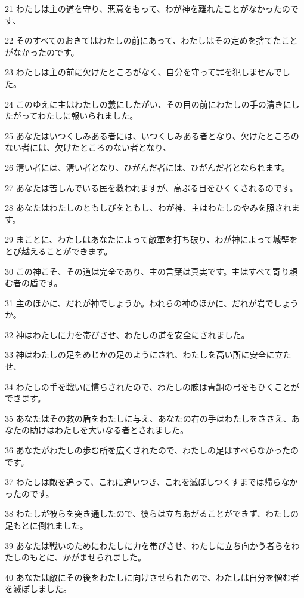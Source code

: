 \par 21 わたしは主の道を守り、悪意をもって、わが神を離れたことがなかったのです、
\par 22 そのすべてのおきてはわたしの前にあって、わたしはその定めを捨てたことがなかったのです。
\par 23 わたしは主の前に欠けたところがなく、自分を守って罪を犯しませんでした。
\par 24 このゆえに主はわたしの義にしたがい、その目の前にわたしの手の清きにしたがってわたしに報いられました。
\par 25 あなたはいつくしみある者には、いつくしみある者となり、欠けたところのない者には、欠けたところのない者となり、
\par 26 清い者には、清い者となり、ひがんだ者には、ひがんだ者となられます。
\par 27 あなたは苦しんでいる民を救われますが、高ぶる目をひくくされるのです。
\par 28 あなたはわたしのともしびをともし、わが神、主はわたしのやみを照されます。
\par 29 まことに、わたしはあなたによって敵軍を打ち破り、わが神によって城壁をとび越えることができます。
\par 30 この神こそ、その道は完全であり、主の言葉は真実です。主はすべて寄り頼む者の盾です。
\par 31 主のほかに、だれが神でしょうか。われらの神のほかに、だれが岩でしょうか。
\par 32 神はわたしに力を帯びさせ、わたしの道を安全にされました。
\par 33 神はわたしの足をめじかの足のようにされ、わたしを高い所に安全に立たせ、
\par 34 わたしの手を戦いに慣らされたので、わたしの腕は青銅の弓をもひくことができます。
\par 35 あなたはその救の盾をわたしに与え、あなたの右の手はわたしをささえ、あなたの助けはわたしを大いなる者とされました。
\par 36 あなたがわたしの歩む所を広くされたので、わたしの足はすべらなかったのです。
\par 37 わたしは敵を追って、これに追いつき、これを滅ぼしつくすまでは帰らなかったのです。
\par 38 わたしが彼らを突き通したので、彼らは立ちあがることができず、わたしの足もとに倒れました。
\par 39 あなたは戦いのためにわたしに力を帯びさせ、わたしに立ち向かう者らをわたしのもとに、かがませられました。
\par 40 あなたは敵にその後をわたしに向けさせられたので、わたしは自分を憎む者を滅ぼしました。
